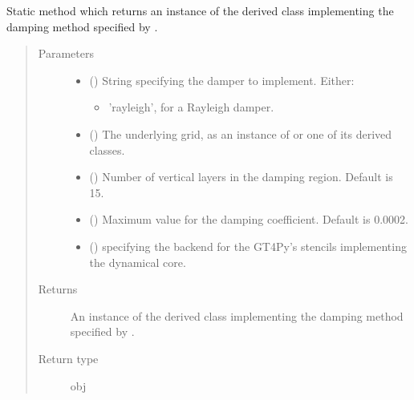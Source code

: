 \documentclass[letterpaper,10pt,english]{sphinxmanual}
\begin{document}
\begin{fulllineitems}
\begin{fulllineitems}
\end{fulllineitems}


\begin{fulllineitems}
\label{\detokenize{api:dycore.vertical_damping.VerticalDamping.factory}}
Static method which returns an instance of the derived class implementing the damping method
specified by .
\begin{quote}\begin{description}
\item[{Parameters}] \leavevmode\begin{itemize}
\item {} 
 () \textendash{} 
String specifying the damper to implement. Either:
\begin{itemize}
\item {} 
’rayleigh’, for a Rayleigh damper.

\end{itemize}


\item {} 
 () \textendash{} The underlying grid, as an instance of {\hyperref[\detokenize{api:grids.grid_xyz.GridXYZ}]{}} or one of its derived classes.

\item {} 
 () \textendash{} Number of vertical layers in the damping region. Default is 15.

\item {} 
 () \textendash{} Maximum value for the damping coefficient. Default is 0.0002.

\item {} 
 () \textendash{}  specifying the backend for the GT4Py’s stencils implementing the dynamical core.

\end{itemize}

\item[{Returns}] \leavevmode
An instance of the derived class implementing the damping method specified by .

\item[{Return type}] \leavevmode
obj

\end{description}\end{quote}

\end{fulllineitems}


\end{fulllineitems}
\end{document}
